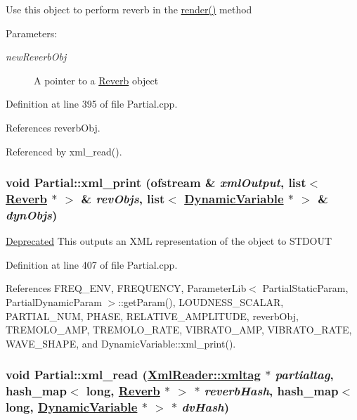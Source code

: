 Use this object to perform reverb in the \hyperlink{classPartial_a1}{render()} method \begin{Desc}
\item[Parameters:]
\begin{description}
\item[{\em new\-Reverb\-Obj}]A pointer to a \hyperlink{classReverb}{Reverb} object \end{description}
\end{Desc}


Definition at line 395 of file Partial.cpp.

References reverb\-Obj.

Referenced by xml\_\-read().\hypertarget{classPartial_a3}{
\subsubsection[xml\_\-print]{\setlength{\rightskip}{0pt plus 5cm}void Partial::xml\_\-print (ofstream \& {\em xml\-Output}, list$<$ \hyperlink{classReverb}{Reverb} $\ast$ $>$ \& {\em rev\-Objs}, list$<$ \hyperlink{classDynamicVariable}{Dynamic\-Variable} $\ast$ $>$ \& {\em dyn\-Objs})}}
\label{classPartial_a3}


\begin{Desc}
\item[\hyperlink{deprecated__deprecated000024}{Deprecated}]This outputs an XML representation of the object to STDOUT \end{Desc}


Definition at line 407 of file Partial.cpp.

References FREQ\_\-ENV, FREQUENCY, Parameter\-Lib$<$ Partial\-Static\-Param, Partial\-Dynamic\-Param $>$::get\-Param(), LOUDNESS\_\-SCALAR, PARTIAL\_\-NUM, PHASE, RELATIVE\_\-AMPLITUDE, reverb\-Obj, TREMOLO\_\-AMP, TREMOLO\_\-RATE, VIBRATO\_\-AMP, VIBRATO\_\-RATE, WAVE\_\-SHAPE, and Dynamic\-Variable::xml\_\-print().\hypertarget{classPartial_a4}{
\subsubsection[xml\_\-read]{\setlength{\rightskip}{0pt plus 5cm}void Partial::xml\_\-read (\hyperlink{classXmlReader_1_1xmltag}{Xml\-Reader::xmltag} $\ast$ {\em partialtag}, hash\_\-map$<$ long, \hyperlink{classReverb}{Reverb} $\ast$ $>$ $\ast$ {\em reverb\-Hash}, hash\_\-map$<$ long, \hyperlink{classDynamicVariable}{Dynamic\-Variable} $\ast$ $>$ $\ast$ {\em dv\-Hash})}}
\label{classPartial_a4}


